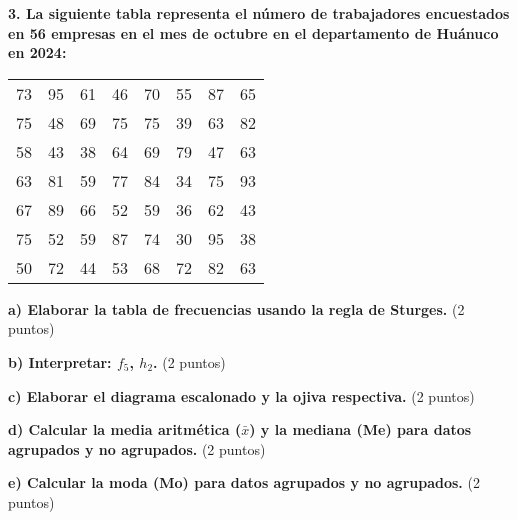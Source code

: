 \documentclass[12pt]{article}
\begin{document}
\vspace{1cm}

\textbf{3. La siguiente tabla representa el número de trabajadores encuestados en 56 empresas en el mes de octubre en el departamento de Huánuco en 2024:}

\begin{center}
\begin{tabular}{|c|c|c|c|c|c|c|c|}
\hline
73 & 95 & 61 & 46 & 70 & 55 & 87 & 65 \\
75 & 48 & 69 & 75 & 75 & 39 & 63 & 82 \\
58 & 43 & 38 & 64 & 69 & 79 & 47 & 63 \\
63 & 81 & 59 & 77 & 84 & 34 & 75 & 93 \\
67 & 89 & 66 & 52 & 59 & 36 & 62 & 43 \\
75 & 52 & 59 & 87 & 74 & 30 & 95 & 38 \\
50 & 72 & 44 & 53 & 68 & 72 & 82 & 63 \\
\hline
\end{tabular}
\end{center}

\textbf{a) Elaborar la tabla de frecuencias usando la regla de Sturges.} (2 puntos)

\textbf{b) Interpretar: $f_5$, $h_2$.} (2 puntos)

\textbf{c) Elaborar el diagrama escalonado y la ojiva respectiva.} (2 puntos)

\textbf{d) Calcular la media aritmética ($\bar{x}$) y la mediana (Me) para datos agrupados y no agrupados.} (2 puntos)

\textbf{e) Calcular la moda (Mo) para datos agrupados y no agrupados.} (2 puntos)
\end{document}
